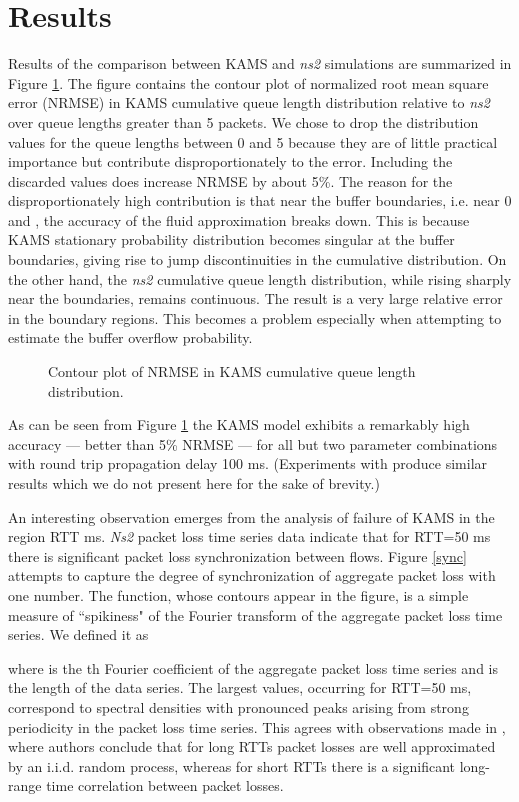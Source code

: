 \documentclass{IEEEtran}[10pt,letterpaper,conference]
\begin{document}
\section{Results}
\label{results}
Results of the comparison between KAMS and \emph{ns2} simulations are summarized in Figure \ref{NRMSE}. The figure contains the contour plot of normalized root mean square error (NRMSE) in KAMS cumulative queue length distribution relative to \emph{ns2} over queue lengths greater than 5 packets.
We chose to drop the distribution values for the queue lengths between 0 and 5 because they are of little practical importance but contribute disproportionately to the error. Including the discarded values does increase NRMSE by about 5\%. The reason for the disproportionately high contribution is that near the buffer boundaries, i.e. near 0 and , the accuracy of the fluid approximation breaks down. This is because KAMS stationary probability distribution becomes singular at the buffer boundaries, giving rise to jump discontinuities in the cumulative distribution. On the other hand, the \emph{ns2} cumulative queue length distribution, while rising sharply near the boundaries, remains continuous. The result is a very large relative error in the boundary regions. This becomes a problem especially when attempting to estimate the buffer overflow probability.

\begin{figure}[ht]
\caption{Contour plot of NRMSE in KAMS cumulative queue length distribution.}
\label{NRMSE}
\end{figure}

As can be seen from Figure \ref{NRMSE} the KAMS model exhibits a remarkably high accuracy --- better than 5\% NRMSE --- for all but two parameter combinations with round trip propagation delay 100 ms. (Experiments with  produce similar results which we do not present here for the sake of brevity.)

An interesting observation emerges from the analysis of failure of KAMS in the region RTT ms. \emph{Ns2} packet loss time series data indicate that for RTT=50 ms there is significant packet loss synchronization between flows. Figure \ref{sync} attempts to capture the degree of synchronization of aggregate packet loss with one number. The function, whose contours appear in the figure, is a simple measure of ``spikiness" of the Fourier transform of the aggregate packet loss time series. We defined it as

where  is the th Fourier coefficient of the aggregate packet loss time series and  is the length of the data series. The largest values, occurring for RTT=50 ms, correspond to spectral densities with pronounced peaks arising from strong periodicity in the packet loss time series. This agrees with observations made in \cite{AltAvrCha}, where authors conclude that for long RTTs packet losses are well approximated by an i.i.d. random process, whereas for short RTTs there is a significant long-range time correlation between packet losses.
\end{document}
